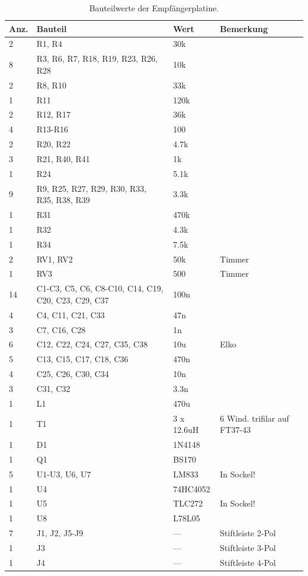 \documentclass[10pt, a4paper]{paper}
\begin{document}
\begin{table}[!ht]
 \begin{tabular}{|p{1cm}|p{6cm}|p{2cm}|p{3cm}|} \hline 
 Anz. & Bauteil & Wert & Bemerkung \\ \hline
 2  & R1, R4 & 30k & \\
 8  & R3, R6, R7, R18, R19, R23, R26, R28 & 10k & \\
 2  & R8, R10 & 33k & \\
 1  & R11 & 120k & \\
 2  & R12, R17 & 36k & \\
 4  & R13-R16 & 100 & \\
 2  & R20, R22 & 4.7k & \\
 3  & R21, R40, R41 & 1k & \\
 1  & R24 & 5.1k & \\
 9  & R9, R25, R27, R29, R30, R33, R35, R38, R39 & 3.3k & \\
 1  & R31 & 470k & \\
 1  & R32 & 4.3k & \\
 1  & R34 & 7.5k & \\
 2  & RV1, RV2 & 50k & Timmer\\
 1  & RV3 & 500 & Timmer \\

 14 & C1-C3, C5, C6, C8-C10, C14, C19, C20, C23, C29, C37 & 100n & \\
 4  & C4, C11, C21, C33 & 47n & \\
 3  & C7, C16, C28 & 1n & \\
 6  & C12, C22, C24, C27, C35, C38 & 10u & Elko \\
 5  & C13, C15, C17, C18, C36 & 470n & \\
 4  & C25, C26, C30, C34 & 10n & \\
 3  & C31, C32 & 3.3n & \\

 1  & L1 & 470u & \\
 1  & T1 & 3 x 12.6uH & 6 Wind. trifilar auf FT37-43 \\

 1  & D1 & 1N4148 & \\ 
 1  & Q1 & BS170 & \\

 5  & U1-U3, U6, U7 & LM833 & In Sockel! \\
 1  & U4 & 74HC4052 & \\
 1  & U5 & TLC272 & In Sockel! \\
 1  & U8 & L78L05 & \\

 7  & J1, J2, J5-J9 & --- & Stiftleiste 2-Pol\\ 
 1  & J3 & --- & Stiftleiste 3-Pol \\
 1  & J4 & --- & Stiftleiste 4-Pol \\\hline
 \end{tabular}
 \caption{Bauteilwerte der Empfängerplatine.}
\end{table}
\end{document}
